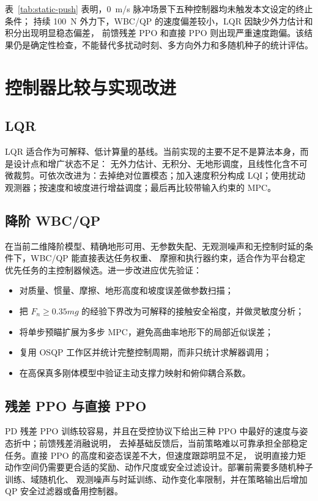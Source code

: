 \documentclass[UTF8,12pt,a4paper,fontset=none]{ctexart}
\begin{document}
表~\ref{tab:static-push} 表明，\SI{0}{m/s} 脉冲场景下五种控制器均未触发本文设定的终止条件；
持续 \SI{100}{N} 外力下，WBC/QP 的速度偏差较小，LQR 因缺少外力估计和积分出现明显稳态偏差，
前馈残差 PPO 和直接 PPO 则出现严重速度跑偏。该结果仍是确定性检查，不能替代多扰动时刻、多方向外力和多随机种子的统计评估。

\FloatBarrier
\section{控制器比较与实现改进}

\subsection{LQR}
LQR 适合作为可解释、低计算量的基线。当前实现的主要不足不是算法本身，而是设计点和增广状态不足：
无外力估计、无积分、无地形调度，且线性化含不可微裁剪。可依次改进为：去掉绝对位置模态；加入速度积分构成
LQI；使用扰动观测器；按速度和坡度进行增益调度；最后再比较带输入约束的 MPC。

\subsection{降阶 WBC/QP}
在当前二维降阶模型、精确地形可用、无参数失配、无观测噪声和无控制时延的条件下，WBC/QP 能直接表达任务权重、
摩擦和执行器约束，适合作为平台稳定优先任务的主控制器候选。进一步改进应优先验证：
\begin{itemize}
  \item 对质量、惯量、摩擦、地形高度和坡度误差做参数扫描；
  \item 把 $F_n\ge0.35mg$ 的经验下界改为可解释的接触安全裕度，并做灵敏度分析；
  \item 将单步预瞄扩展为多步 MPC，避免高曲率地形下的局部近似误差；
  \item 复用 OSQP 工作区并统计完整控制周期，而非只统计求解器调用；
  \item 在高保真多刚体模型中验证主动支撑力映射和俯仰耦合系数。
\end{itemize}

\subsection{残差 PPO 与直接 PPO}
PD 残差 PPO 训练较容易，并且在受控协议下给出三种 PPO 中最好的速度与姿态折中；前馈残差消融说明，
去掉基础反馈后，当前策略难以可靠承担全部稳定任务。直接 PPO 的高度和姿态误差不大，但速度跟踪明显不足，
说明直接力矩动作空间仍需要更合适的奖励、动作尺度或安全过滤设计。部署前需要多随机种子训练、域随机化、
观测噪声与时延训练、动作变化率限制，并在策略输出后增加 QP 安全过滤器或备用控制器。
\end{document}

